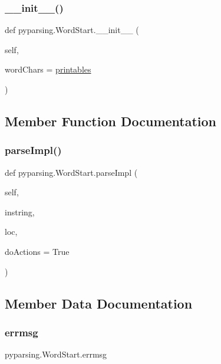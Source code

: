 \subsubsection{\texorpdfstring{\+\_\+\+\_\+init\+\_\+\+\_\+()}{\_\_init\_\_()}}
{\footnotesize\ttfamily def pyparsing.\+Word\+Start.\+\_\+\+\_\+init\+\_\+\+\_\+ (\begin{DoxyParamCaption}\item[{}]{self,  }\item[{}]{word\+Chars = {\ttfamily \hyperlink{namespacepyparsing_ad8c4f09cc517099e759be4c94403f9b4}{printables}} }\end{DoxyParamCaption})}



\subsection{Member Function Documentation}
\mbox{\label{classpyparsing_1_1WordStart_a15a97614c4b8c94f3e7e5fa776d12818}} 
\subsubsection{\texorpdfstring{parse\+Impl()}{parseImpl()}}
{\footnotesize\ttfamily def pyparsing.\+Word\+Start.\+parse\+Impl (\begin{DoxyParamCaption}\item[{}]{self,  }\item[{}]{instring,  }\item[{}]{loc,  }\item[{}]{do\+Actions = {\ttfamily True} }\end{DoxyParamCaption})}



\subsection{Member Data Documentation}
\mbox{\label{classpyparsing_1_1WordStart_a1bb135bcea1c42bdebd0ec3d1418cc5a}} 
\subsubsection{\texorpdfstring{errmsg}{errmsg}}
{\footnotesize\ttfamily pyparsing.\+Word\+Start.\+errmsg}

